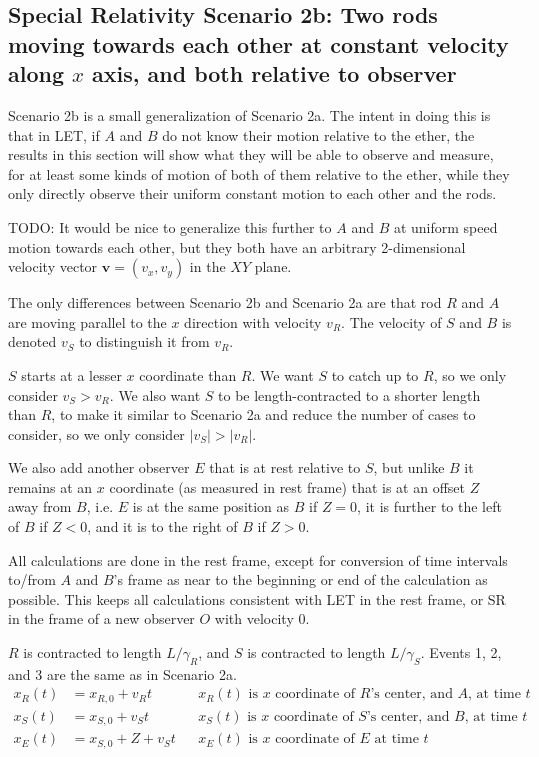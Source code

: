 \documentclass[a4paper]{article}
\theoremstyle{plain}
\theoremstyle{definition}
\newcommand{\vect}[1]{\mathbf{#1}}
\begin{document}
\subsection{Special Relativity Scenario 2b: Two rods moving towards each other at constant velocity along $x$ axis, and both relative to observer}
\label{sec:scen2b}

Scenario 2b is a small generalization of Scenario 2a.  The intent in
doing this is that in LET, if $A$ and $B$ do not know their motion
relative to the ether, the results in this section will show what they
will be able to observe and measure, for at least some kinds of motion
of both of them relative to the ether, while they only directly
observe their uniform constant motion to each other and the rods.

TODO: It would be nice to generalize this further to $A$ and $B$ at
uniform speed motion towards each other, but they both have an
arbitrary 2-dimensional velocity vector $\vect v = (v_x, v_y)$ in the
$XY$ plane.

The only differences between Scenario 2b and Scenario 2a are that rod
$R$ and $A$ are moving parallel to the $x$ direction with velocity
$v_R$.  The velocity of $S$ and $B$ is denoted $v_S$ to distinguish it
from $v_R$.

$S$ starts at a lesser $x$ coordinate than $R$.  We want $S$ to catch
up to $R$, so we only consider $v_S > v_R$.  We also want $S$ to be
length-contracted to a shorter length than $R$, to make it similar to
Scenario 2a and reduce the number of cases to consider, so we only
consider $|v_S| > |v_R|$.

We also add another observer $E$ that is at rest relative to $S$, but
unlike $B$ it remains at an $x$ coordinate (as measured in rest frame)
that is at an offset $Z$ away from $B$, i.e. $E$ is at the same
position as $B$ if $Z=0$, it is further to the left of $B$ if $Z < 0$,
and it is to the right of $B$ if $Z > 0$.

All calculations are done in the rest frame, except for conversion of
time intervals to/from $A$ and $B$'s frame as near to the beginning or
end of the calculation as possible.  This keeps all calculations
consistent with LET in the rest frame, or SR in the frame of a new
observer $O$ with velocity 0.

$R$ is contracted to length $L/\gamma_{R}$,
and $S$ is contracted to length $L/\gamma_{S}$.
Events 1, 2, and 3 are the same as in Scenario 2a.
\begin{align}
x_R(t) & = x_{R,0} + v_R t & & \text{$x_R(t)$ is $x$ coordinate of $R$'s center, and $A$, at time $t$} \label{eqn:scen2b-R-xcoord} \\
x_S(t) & = x_{S,0} + v_S t & & \text{$x_S(t)$ is $x$ coordinate of $S$'s center, and $B$, at time $t$} \label{eqn:scen2b-S-xcoord} \\
x_E(t) & = x_{S,0} + Z + v_S t & & \text{$x_E(t)$ is $x$ coordinate of $E$ at time $t$} \label{eqn:scen2b-E-xcoord}
\end{align}
\end{document}

